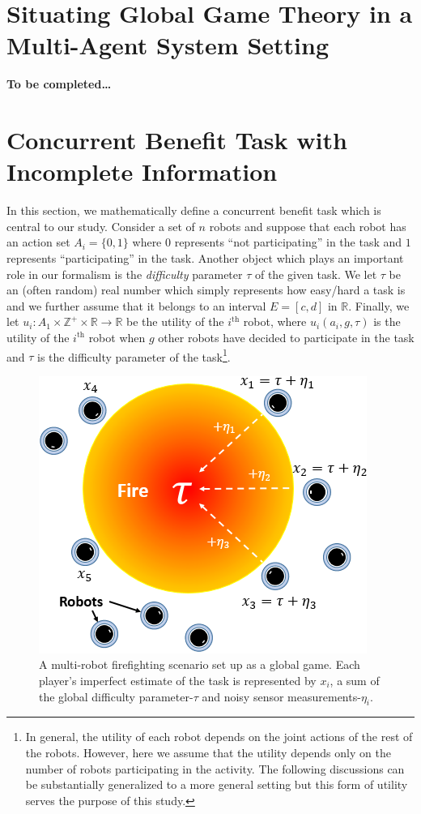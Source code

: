 \documentclass[conference]{ieeeconf}
\def\Z{\mathbb{Z}}
\def\R{\mathbb{R}}
\begin{document}
\section{Situating Global Game Theory in a Multi-Agent System Setting}\label{sec:ggmas}
\textbf{To be completed\ldots}


\section{Concurrent Benefit Task with Incomplete Information}\label{sec:conbenefit}
In this section, we mathematically define a concurrent benefit task which is central to our study. Consider a set of $n$ robots and suppose that each robot has an action set $A_i=\{0,1\}$ where $0$ represents ``not participating'' in the task and $1$ represents ``participating'' in the task.  Another object which plays an important role in our formalism is the \textit{difficulty} parameter $\tau$ of the given task. We let $\tau$ be an (often random) real number which simply represents how easy/hard a task is and we further assume that it belongs to an interval $E=[c,d]$ in $\R$.  Finally, we let $u_i:A_1\times\Z^+\times \R\to \R$ be the utility of the $i^{\text{th}}$ robot, where $u_i(a_i,g,\tau)$ is the utility of the $i^{\text{th}}$ robot when $g$ other robots have decided to participate in the task and $\tau$ is the difficulty parameter of the task\footnote{In general, the utility of each robot depends on the joint actions of the rest of the robots. However, here we assume that the utility depends only on the number of robots participating in the activity. The following discussions can be substantially generalized to a more general setting but this form of utility serves the purpose of this study.}. 

\begin{figure}[!htb]
\centering\includegraphics[width=\columnwidth]{../figures/globalgamesetup.png}
\centering\caption{A multi-robot firefighting scenario set up as a global game. Each player's imperfect estimate of the task is represented by $x_i$, a sum of the global difficulty parameter-$\tau$ and noisy sensor measurements-$\eta_i$.}\label{fig:ggsetup}
\end{figure}
\end{document}
